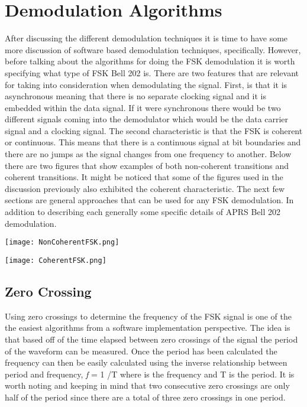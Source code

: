 \chapter{Demodulation Algorithms}
After discussing the different demodulation techniques it is time to have some more discussion of software based demodulation techniques, specifically. However, before talking about the algorithms for doing the FSK demodulation it is worth specifying what type of FSK Bell 202 is. There are two features that are relevant for taking into consideration when demodulating the signal. First, is that it is asynchronous meaning that there is no separate clocking signal and it is embedded within the data signal. If it were synchronous there would be two different signals coming into the demodulator which would be the data carrier signal and a clocking signal. The second characteristic is that the FSK is coherent or continuous. This means that there is a continuous signal at bit boundaries and there are no jumps as the signal changes from one frequency to another. Below there are two figures that show examples of both non-coherent transitions and coherent transitions. It might be noticed that some of the figures used in the discussion previously also exhibited the coherent characteristic. The next few sections are general approaches that can be used for any FSK demodulation. In addition to describing each generally some specific details of APRS Bell 202 demodulation. 
\begin{Figure}
  \centering
	\texttt{[image: NonCoherentFSK.png]} 
\end{Figure}
\begin{Figure}
  \centering
	\texttt{[image: CoherentFSK.png]} 
\end{Figure}

\section{Zero Crossing}
Using zero crossings to determine the frequency of the FSK signal is one of the the easiest algorithms from a software implementation perspective. The idea is that based off of the time elapsed between zero crossings of the signal the period of the waveform can be measured. Once the period has been calculated the frequency can then be easily calculated using the inverse relationship between period and frequency, \textit{f} = 1 /T where  is the frequency and T is the period. It is worth noting and keeping in mind that two consecutive zero crossings are only half of the period since there are a total of three zero crossings in one period.

